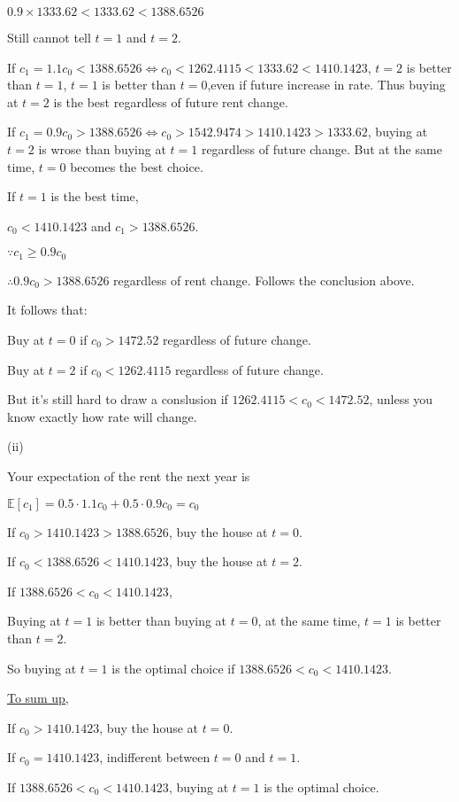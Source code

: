 \documentclass{article}
\begin{document}
$0.9\times 1333.62<1333.62<1388.6526$

Still cannot tell $t=1$ and $t=2$.

If $c_{1}=1.1c_{0}<1388.6526\iff c_{0}<\boxed{1262.4115}<1333.62<1410.1423$, $t=2$ is better than $t=1$, $t=1$ is better than $t=0$,even if future increase in rate. Thus buying at $t=2$ is the best regardless of future rent change.

If $c_{1}=0.9c_{0}>1388.6526\iff c_{0}>\boxed{1542.9474}>1410.1423>1333.62$, buying at $t=2$ is wrose than buying at $t=1$ regardless of future change. But at the same time, $t=0$ becomes the best choice.

If $t=1$ is the best time,

$c_{0}<1410.1423$ and $c_{1}>1388.6526$.

$\because c_{1}\geqslant0.9c_{0}$

$\therefore0.9c_{0}>1388.6526$ regardless of rent change. Follows the conclusion above.

It follows that:

Buy at $t=0$ if $c_{0}>1472.52$ regardless of future change.

Buy at $t=2$ if $c_{0}<1262.4115$ regardless of future change.

But it's still hard to draw a conslusion if $1262.4115<c_{0}<1472.52$, unless you know exactly how rate will change.

\newpage

(ii)

Your expectation of the rent the next year is 

$\mathbb{E} \left[c_{1}\right]=0.5\cdot1.1c_{0}+0.5\cdot0.9c_{0}=c_{0}$

If $c_{0}>1410.1423>1388.6526$, buy the house at $t=0$.

If $c_{0}<1388.6526<1410.1423$, buy the house at $t=2$.

If $1388.6526<c_{0}<1410.1423$,

Buying at $t=1$ is better than buying at $t=0$, at the same time, $t=1$ is better than $t=2$.

So buying at $t=1$ is the optimal choice if $1388.6526<c_{0}<1410.1423$.

\underline{To sum up,}

If $c_{0}>1410.1423$, buy the house at $t=0$.

If $c_{0}=1410.1423$, indifferent between $t=0$ and $t=1$.

If $1388.6526<c_{0}<1410.1423$, buying at $t=1$ is the optimal choice.
\end{document}
